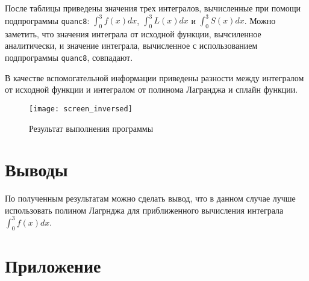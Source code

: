 После таблицы приведены значения трех интегралов, вычисленные при помощи подпрограммы \texttt{quanc8}: $\int_0^3 f(x)dx$, $\int_0^3 L(x)dx$ и $\int_0^3 S(x)dx$. Можно заметить, что значения интеграла от исходной функции, вычсиленное аналитически, и значение интеграла, вычисленное с использованием подпрограммы \texttt{quanc8}, совпадают.

В качестве вспомогательной информации приведены разности между интегралом от исходной функции и интегралом от полинома Лагранджа и сплайн функции.

\begin{figure}[H]
\begin{center}
	\texttt{[image: screen\_inversed]}
	\caption{Результат выполнения программы}
	\label{fig:res}
\end{center}
\end{figure}

\section{Выводы}

По полученным результатам можно сделать вывод, что в данном случае лучше использовать полином Лагрнджа для приближенного вычисления интеграла $\int_0^3 f(x)dx$. 

\newpage

\section*{Приложение}


\parindent=1cm


